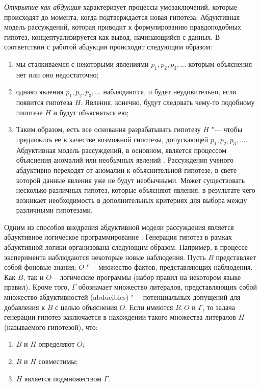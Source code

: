 \textit{Открытие как абдукция} характеризует процессы умозаключений, которые происходят до момента, когда 
подтверждается новая гипотеза. Абдуктивная модель рассуждений, которая приводит к формулированию правдоподобных гипотез, 
концептуализируется как вывод, начинающийся с данных. В соответствии с работой \cite{nickles1980scientific} абдукция 
происходит следующим образом:

\begin{enumerate}
    \item мы сталкиваемся с некоторыми явлениями $p_1, p_2, p_3, \ldots $ которым объяснения нет или оно недостаточно;
    \item однако явления  $p_1, p_2, p_3, \ldots $ наблюдаются, и будет неудивительно, если появится гипотеза $H$. 
            Явления, конечно, будут следовать чему-то подобному гипотезе $H$ и будут объясняться ею; 
    \item Таким образом, есть все основания разрабатывать гипотезу $H$ "--- чтобы предложить ее в качестве возможной 
            гипотезы, допускающей $p_1, p_2, p_3, \ldots $. Абдуктивная модель рассуждений, в основном, является 
            процессом объяснения аномалий или необычных явлений \cite{Schickore2014}. Рассуждения ученого абдуктивно 
            переходят от аномалии к объяснительной гипотезе, в свете которой данные явления уже не будут необычными. 
            Может существовать несколько различных гипотез, которые объясняют явления, в результате чего возникает 
            необходимость в дополнительных критериях для выбора между различными гипотезами.
\end{enumerate}

Одним из способов внедрения абдуктивной модели рассуждения является абдуктивное логическое программирование 
\cite{Kakas1992}. Генерация гипотез в рамках абдуктивной логики организована следующим образом. Например, в процессе 
эксперимента наблюдаются некоторые новые наблюдения. Пусть $B$ представляет собой фоновые знания; $O$ "--- множество 
фактов, представляющих наблюдения. Как $B$, так и $O$ – логические программы (набор правил на некотором языке правил). 
Кроме того, $\Gamma$ обозначает множество литералов, представляющих собой множество абдуктивностей (abducibles) "--- 
потенциальных допущений для добавления к $B$ с целью объяснения $O$. Если имеются $B, O$ и $\Gamma$, то задача 
генерации гипотез заключается в нахождении такого множества литералов $H$ (называемого гипотезой), что: 

\begin{enumerate}
    \item $B$ и $H$ определяют $O$;
    \item $B$ и $H$ совместимы;
    \item $H$ является подмножеством $\Gamma$.
\end{enumerate}


